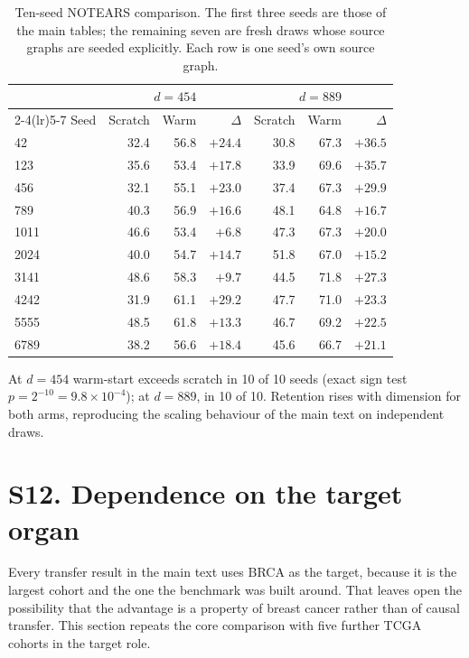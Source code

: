 \documentclass[11pt]{article}
\begin{document}
\setcounter{table}{11}
\begin{table}[h]
\caption{Ten-seed NOTEARS comparison. The first three seeds are those of the main tables; the remaining seven are fresh draws whose source graphs are seeded explicitly. Each row is one seed's own source graph.}
\begin{tabular}{@{}lrrrrrr@{}}
\toprule
& \multicolumn{3}{c}{$d=454$} & \multicolumn{3}{c}{$d=889$}\\
\cmidrule(lr){2-4}\cmidrule(lr){5-7}
Seed & Scratch & Warm & $\Delta$ & Scratch & Warm & $\Delta$\\
\midrule
42 & 32.4 & 56.8 & $+24.4$ & 30.8 & 67.3 & $+36.5$\\
123 & 35.6 & 53.4 & $+17.8$ & 33.9 & 69.6 & $+35.7$\\
456 & 32.1 & 55.1 & $+23.0$ & 37.4 & 67.3 & $+29.9$\\
789 & 40.3 & 56.9 & $+16.6$ & 48.1 & 64.8 & $+16.7$\\
1011 & 46.6 & 53.4 & $+6.8$ & 47.3 & 67.3 & $+20.0$\\
2024 & 40.0 & 54.7 & $+14.7$ & 51.8 & 67.0 & $+15.2$\\
3141 & 48.6 & 58.3 & $+9.7$ & 44.5 & 71.8 & $+27.3$\\
4242 & 31.9 & 61.1 & $+29.2$ & 47.7 & 71.0 & $+23.3$\\
5555 & 48.5 & 61.8 & $+13.3$ & 46.7 & 69.2 & $+22.5$\\
6789 & 38.2 & 56.6 & $+18.4$ & 45.6 & 66.7 & $+21.1$\\
\bottomrule
\end{tabular}
\label{tab:S12}
\end{table}

\noindent At $d=454$ warm-start exceeds scratch in 10 of 10 seeds (exact sign test $p=2^{-10}=9.8\times10^{-4}$); at $d=889$, in 10 of 10. Retention rises with dimension for both arms, reproducing the scaling behaviour of the main text on independent draws.

\section*{S12. Dependence on the target organ}

Every transfer result in the main text uses BRCA as the target, because it is the
largest cohort and the one the benchmark was built around. That leaves open the
possibility that the advantage is a property of breast cancer rather than of causal
transfer. This section repeats the core comparison with five further TCGA cohorts in
the target role.
\end{document}
